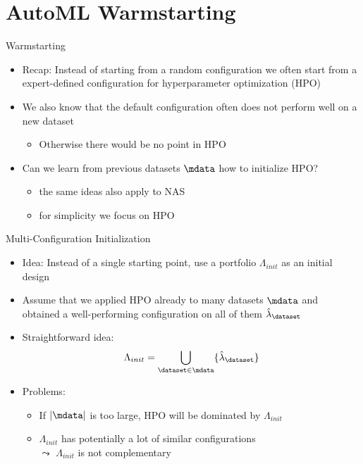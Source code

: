 \section{AutoML Warmstarting}
\begin{frame}[c]{Warmstarting}

\begin{itemize}
	\item Recap: Instead of starting from a random configuration we often start from a expert-defined configuration for hyperparameter optimization (HPO)
	\pause
	\item We also know that the default configuration often does not perform well on a new dataset
	\begin{itemize}
		\item Otherwise there would be no point in HPO
	\end{itemize}
	\pause
	\item \alert{Can we learn from previous datasets $\mdata$ how to initialize HPO?}
	\begin{itemize}
		\item the same ideas also apply to NAS
		\item for simplicity we focus on HPO 
	\end{itemize}
\end{itemize}

\end{frame}
\begin{frame}[c]{Multi-Configuration Initialization}

\begin{itemize}
	\item Idea: Instead of a single starting point, use a \alert{portfolio $\Lambda_{init}$} as an initial design
	\item Assume that we applied HPO already to many datasets $\mdata$ and\\
	obtained a well-performing configuration on all of them $\hat{\lambda}_\dataset$
	\item Straightforward idea: 
	$$\Lambda_{init} = \bigcup_{\dataset \in \mdata} \{ \hat{\lambda}_\dataset \}$$
	\item Problems:
	\begin{itemize}
		\item If $|\mdata|$ is too large, HPO will be dominated by $\Lambda_{init}$
		\item $\Lambda_{init}$ has potentially a lot of similar configurations\\
		$\leadsto$ $\Lambda_{init}$ is not complementary
	\end{itemize}
\end{itemize}


\end{frame}
